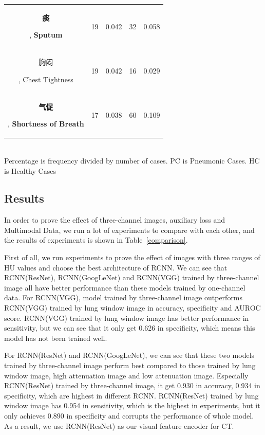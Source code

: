\documentclass[journal]{IEEEtran}
\begin{document}
\begin{table}[htb]
\begin{center}
\begin{tabular}{|c|c|c|c|c|}
        \begin{CJK}{UTF8}{gbsn}\textbf{痰}\end{CJK}, \textbf{Sputum}& 19 & 0.042 & 32 & 0.058\\
        \begin{CJK}{UTF8}{gbsn}胸闷\end{CJK}, Chest Tightness & 19 & 0.042 & 16 & 0.029\\
        \begin{CJK}{UTF8}{gbsn}\textbf{气促}\end{CJK}, \textbf{Shortness of Breath}& 17 & 0.038 & 60 & 0.109\\
        
        \hline
        \end{tabular}
        \vspace{0.1cm}
        \label{frequency2}\\
        \footnotesize{Percentage is frequency divided by number of cases. PC is Pneumonic Cases. HC is Healthy Cases}
    
        \end{center}
        \vspace{-0.0cm}
        \end{table}

\subsection{Results}
\label{results}
In order to prove the effect of three-channel images, auxiliary loss and Multimodal Data, we run a lot of experiments to compare with each other, and the results of experiments is shown in Table~\ref{comparison}.

First of all, we run experiments to prove the effect of images with three ranges of HU values and choose the best architecture of RCNN. We can see that RCNN(ResNet), RCNN(GoogLeNet) and RCNN(VGG) trained by three-channel image all have better performance than these models trained by one-channel data. 
For RCNN(VGG), model trained by three-channel image outperforms RCNN(VGG) trained by lung window image in accuracy, specificity and AUROC score. RCNN(VGG) trained by lung window image has better performance in sensitivity, but we can see that it only get 0.626 in specificity, which means this model has not been trained well. 

For RCNN(ResNet) and RCNN(GoogLeNet), we can see that these two models trained by three-channel image perform best compared to those trained by lung window image, high attenuation image and low attenuation image. Especially RCNN(ResNet) trained by three-channel image, it get 0.930 in accuracy, 0.934 in specificity, which are highest in different RCNN. RCNN(ResNet) trained by lung window image has 0.954 in sensitivity, which is the highest in experiments, but it only achieves 0.890 in specificity and corrupts the performance of whole model. As a result, we use RCNN(ResNet) as our visual feature encoder for CT.
\end{document}
